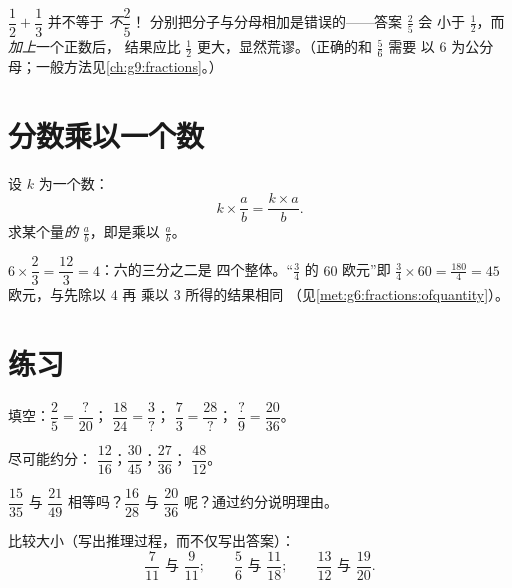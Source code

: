 \begin{example}[经典陷阱]\label{ex:g7:fractions:trap}
$\dfrac12 + \dfrac13$ 并不等于 \emph{不}$\dfrac{2}{5}$！
分别把分子与分母相加是错误的——答案 $\frac25$ 会
小于 $\frac12$，而\emph{加上}一个正数后，
结果应比 $\frac12$ 更大，显然荒谬。（正确的和 $\frac56$ 需要
以 $6$ 为公分母；一般方法见\cref{ch:g9:fractions}。）
\end{example}

\section{分数乘以一个数}

\begin{proposition}[分数乘以一个数]\label{prop:g7:fractions:mult}
设 $k$ 为一个数：
\[
k \times \frac{a}{b} = \frac{k \times a}{b} .
\]
求某个量\emph{的} $\frac ab$，即是乘以
$\frac ab$。
\end{proposition}
\admitted

\begin{example}\label{ex:g7:fractions:mult}
$6 \times \dfrac{2}{3} = \dfrac{12}{3} = 4$：六的三分之二是
四个整体。“$\frac34$ 的 $60$ 欧元”即
$\frac34 \times 60 = \frac{180}{4} = 45$ 欧元，与先除以 $4$ 再
乘以 $3$ 所得的结果相同
（见\cref{met:g6:fractions:ofquantity}）。
\end{example}

\section{练习}

\begin{exercise}[$\star$]\label{exo:g7:fractions:1}
填空：$\dfrac{2}{5} = \dfrac{?}{20}$；\quad
$\dfrac{18}{24} = \dfrac{3}{?}$；\quad
$\dfrac{7}{3} = \dfrac{28}{?}$；\quad
$\dfrac{?}{9} = \dfrac{20}{36}$。
\end{exercise}

\begin{exercise}[$\star$]\label{exo:g7:fractions:2}
尽可能约分：
$\dfrac{12}{16}$；\quad $\dfrac{30}{45}$；\quad $\dfrac{27}{36}$；
\quad $\dfrac{48}{12}$。
\end{exercise}

\begin{exercise}[$\star$]\label{exo:g7:fractions:3}
$\dfrac{15}{35}$ 与 $\dfrac{21}{49}$ 相等吗？$\dfrac{16}{28}$
与 $\dfrac{20}{36}$ 呢？通过约分说明理由。
\end{exercise}

\begin{exercise}[$\star$]\label{exo:g7:fractions:4}
比较大小（写出推理过程，而不仅写出答案）：
\[
\frac{7}{11} \text{ 与 } \frac{9}{11}; \qquad
\frac{5}{6} \text{ 与 } \frac{11}{18}; \qquad
\frac{13}{12} \text{ 与 } \frac{19}{20}.
\]
\end{exercise}

